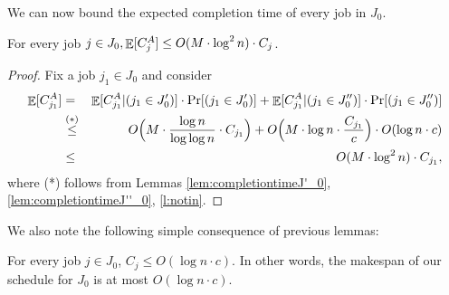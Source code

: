   We can now bound the expected completion time of every job in $J_0$.
  \begin{lemma}
  \label{lem:completiontimeJ0}
  For every job $j \in J_0, \mathop{\mathbb{E}}[C^A_j] \leq O(M \cdot \log^2 n ) \cdot C_j$.
  \end{lemma}
  \begin{proof} 
  Fix a job $j_1 \in J_0$ and consider
  \begin{eqnarray*}
  \mathop{\mathbb{E}}[C^A_{j_1}]  &=& \mathop{\mathbb{E}}[C^A_{j_1} | (j_1 \in J'_0)] \cdot \text{Pr}[ (j_1  \in J'_0)] + \mathop{\mathbb{E}}[C^A_{j_1} | (j_1  \in J''_0)] \cdot \text{Pr}[ (j_1 \in J''_0)]  \\
  &\stackrel{(*)}{\leq}& O\Big( M \cdot \frac{\log n}{\log \log n} \cdot C_{j_1}\Big) +  O\Big(M \cdot \log n \cdot \frac{C_{j_1}}{c}\Big) \cdot O( \log n \cdot c)   \\
  &\leq& O(M \cdot \log^2 n) \cdot C_{j_1}, 
  \end{eqnarray*}
  where (*) follows from Lemmas  \ref{lem:completiontimeJ'_0}, \ref{lem:completiontimeJ''_0}, \ref{l:notin}.
  \end{proof}
  We also note the following simple consequence of previous lemmas:
  
  \begin{lemma}
  \label{lem:makespanofJ0}
  For every job $j \in J_0$, $C_j \leq O(\log n \cdot c)$.  In other words,  the makespan of our schedule for $J_0$ is at most $O(\log n \cdot c)$.
  \end{lemma}
  
  
